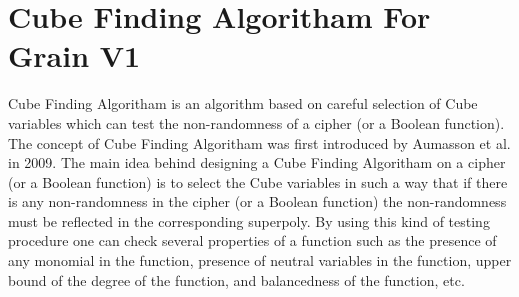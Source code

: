 \section{Cube Finding Algoritham For Grain V1}
Cube Finding Algoritham is an algorithm based on careful selection of Cube
variables which can test the non-randomness of a cipher (or a Boolean function).
The concept of Cube Finding Algoritham was first introduced by Aumasson et al. \cite{10.1007/978-3-642-03317-9_1} in 2009.
The main idea behind designing a Cube Finding Algoritham on a cipher (or a Boolean function)
is to select the Cube variables in such a way that if there is any non-randomness
in the cipher (or a Boolean function) the non-randomness must be reflected in
the corresponding superpoly. By using this kind of testing procedure one can check
several properties of a function such as the presence of any monomial in the function,
presence of neutral variables in the function, upper bound of the degree of the
function, and balancedness of the function, etc. 

